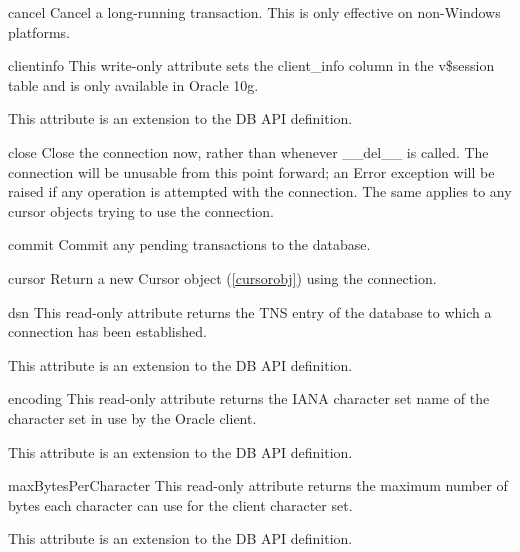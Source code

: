 \documentclass{manual}
\begin{document}
\begin{funcdesc}{cancel}{}
  Cancel a long-running transaction. This is only effective on non-Windows
  platforms.
\end{funcdesc}

\begin{datadesc}{clientinfo}
  This write-only attribute sets the client_info column in the v\$session table
  and is only available in Oracle 10g.

   This attribute is an extension to the DB API definition.
\end{datadesc}

\begin{funcdesc}{close}{}
  Close the connection now, rather than whenever __del__ is called. The
  connection will be unusable from this point forward; an Error exception will
  be raised if any operation is attempted with the connection. The same applies
  to any cursor objects trying to use the connection.
\end{funcdesc}

\begin{funcdesc}{commit}{}
  Commit any pending transactions to the database.
\end{funcdesc}

\begin{funcdesc}{cursor}{}
  Return a new Cursor object (\ref{cursorobj}) using the connection.
\end{funcdesc}

\begin{datadesc}{dsn}
  This read-only attribute returns the TNS entry of the database to which a
  connection has been established.

   This attribute is an extension to the DB API definition.
\end{datadesc}

\begin{datadesc}{encoding}
  This read-only attribute returns the IANA character set name of the character
  set in use by the Oracle client.

   This attribute is an extension to the DB API definition.
\end{datadesc}

\begin{datadesc}{maxBytesPerCharacter}
  This read-only attribute returns the maximum number of bytes each character
  can use for the client character set.

   This attribute is an extension to the DB API definition.
\end{datadesc}
\end{document}
